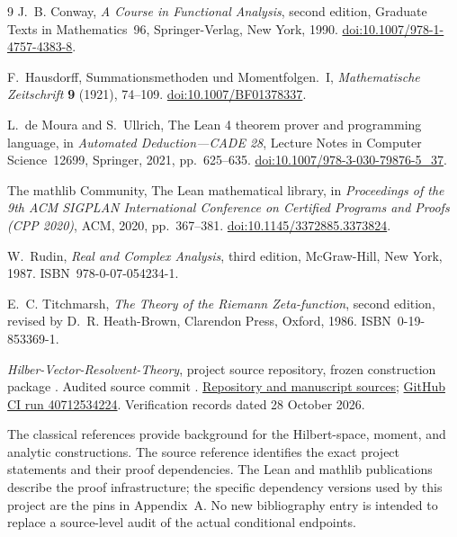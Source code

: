 \begingroup
\renewcommand{\section}[2]{}%
\begin{thebibliography}{9}
\setlength{\itemsep}{9pt}
J.~B. Conway, \emph{A Course in Functional Analysis}, second edition,
Graduate Texts in Mathematics~96, Springer-Verlag, New York, 1990.
\href{https://doi.org/10.1007/978-1-4757-4383-8}{doi:10.1007/978-1-4757-4383-8}.

F.~Hausdorff, Summationsmethoden und Momentfolgen.~I,
\emph{Mathematische Zeitschrift} \textbf{9} (1921), 74--109.
\href{https://doi.org/10.1007/BF01378337}{doi:10.1007/BF01378337}.

L.~de Moura and S.~Ullrich, The Lean 4 theorem prover and programming
language, in \emph{Automated Deduction---CADE 28}, Lecture Notes in
Computer Science~12699, Springer, 2021, pp.~625--635.
\href{https://doi.org/10.1007/978-3-030-79876-5_37}{doi:10.1007/978-3-030-79876-5\_37}.

The mathlib Community, The Lean mathematical library,
in \emph{Proceedings of the 9th ACM SIGPLAN International Conference
on Certified Programs and Proofs (CPP 2020)}, ACM, 2020, pp.~367--381.
\href{https://doi.org/10.1145/3372885.3373824}{doi:10.1145/3372885.3373824}.

W.~Rudin, \emph{Real and Complex Analysis}, third edition,
McGraw-Hill, New York, 1987. ISBN~978-0-07-054234-1.

E.~C. Titchmarsh, \emph{The Theory of the Riemann Zeta-function},
second edition, revised by D.~R. Heath-Brown,
Clarendon Press, Oxford, 1986. ISBN~0-19-853369-1.

\emph{Hilber-Vector-Resolvent-Theory}, project source repository,
frozen construction package
.
Audited source commit .
\href{https://github.com/randogelist/Hilber-Vector-Resolvent-Theory}{Repository and manuscript sources};
\href{https://github.com/randogelist/Hilber-Vector-Resolvent-Theory/actions/runs/40712534224}{GitHub CI run 40712534224}.
Verification records dated 28 October 2026.
\end{thebibliography}
\endgroup
\medskip
The classical references provide background for the Hilbert-space,
moment, and analytic constructions. The source reference identifies
the exact project statements and their proof dependencies. The Lean
and mathlib publications describe the proof infrastructure; the
specific dependency versions used by this project are the pins in
Appendix~A. No new bibliography entry is intended to replace a
source-level audit of the actual conditional endpoints.

